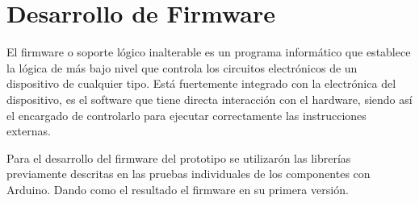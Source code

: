 \section{Desarrollo de Firmware}
\par 
El firmware o soporte lógico inalterable es un programa informático que establece la lógica de más bajo nivel que controla los circuitos electrónicos de un dispositivo de cualquier tipo. Está fuertemente integrado con la electrónica del dispositivo, es el software que tiene directa interacción con el hardware, siendo así el encargado de controlarlo para ejecutar correctamente las instrucciones externas.\cite{firmware}

\par \noindent
Para el desarrollo del firmware del prototipo se utilizarón las librerías previamente descritas en las pruebas individuales de los componentes con Arduino. Dando como el resultado el firmware en su primera versión.

